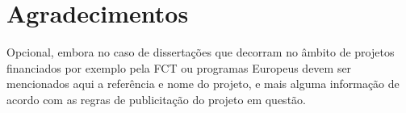\chapter{Agradecimentos}
Opcional, embora no caso de dissertações que decorram no âmbito de projetos financiados por exemplo pela FCT ou programas Europeus devem ser mencionados aqui a referência e nome do projeto, e mais alguma informação de acordo com as regras de publicitação do projeto em questão.

\vspace{10mm} %

